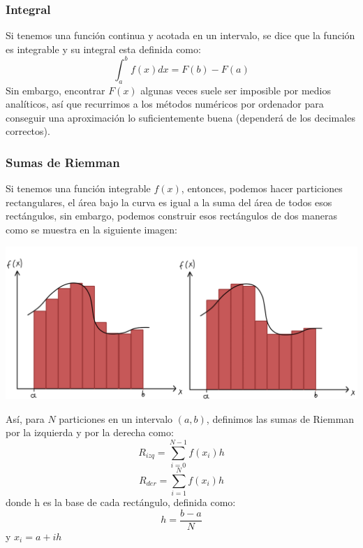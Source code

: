 \documentclass[10pt]{article}
\begin{document}
\begin{multicols}{2}
		\subsubsection{Integral}
		Si tenemos una función continua y acotada en un intervalo, se dice que la función es integrable y su integral esta definida como:
		$$\int_a^b f(x) dx=F(b)-F(a)$$
		Sin embargo, encontrar $F(x)$ algunas veces suele ser imposible por medios analíticos, así que recurrimos a los métodos numéricos por ordenador para conseguir una aproximación lo suficientemente buena (dependerá de los decimales correctos).
		\subsubsection{Sumas de Riemman} 
		Si tenemos una función integrable $f(x)$, entonces, podemos hacer particiones rectangulares, el área bajo la curva es igual a la suma del área de todos esos rectángulos, sin embargo, podemos construir esos rectángulos de dos maneras como se muestra en la siguiente imagen:\\
		\begin{center}
			\includegraphics[scale=0.2]{../Imagenes/1.png}
		\end{center}
		Así, para $N$ particiones en un intervalo $(a,b)$, definimos las sumas de Riemman por la izquierda y por la derecha como:
		$$R_{izq}=\sum_{i=0}^{N-1}f(x_i)h$$
		$$R_{der}=\sum_{i=1}^{N}f(x_i)h$$
		donde h es la base de cada rectángulo, definida como:
		$$h=\frac{b-a}{N}$$
		y $x_i=a+ih$

\end{multicols}
\end{document}
